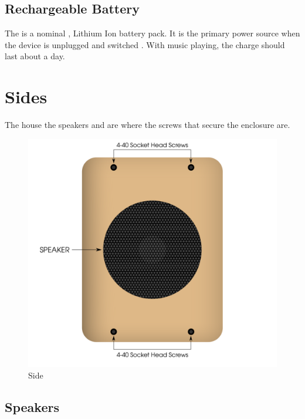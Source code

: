 \section{Rechargeable Battery} \label{Rechargeable Battery}

The  is a nominal , 
Lithium Ion battery pack.  It is the primary power source when the device is
unplugged and switched .  With music playing, the charge should last
about a day.

\chapter{Sides} \label{Sides}

The  house the speakers and are where the screws that secure the
enclosure are.

\begin{figure}[H]
\centering
  \includegraphics{images/side.png}
\caption{Side}
\end{figure}

\section{Speakers} \label{Speakers}

